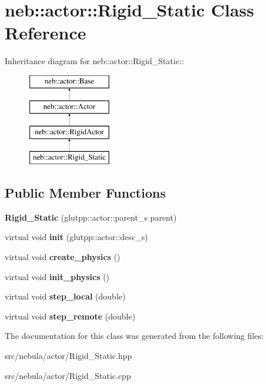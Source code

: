 \hypertarget{classneb_1_1actor_1_1Rigid__Static}{
\section{neb::actor::Rigid\_\-Static Class Reference}
\label{classneb_1_1actor_1_1Rigid__Static}
}
Inheritance diagram for neb::actor::Rigid\_\-Static::\begin{figure}[H]
\begin{center}
\leavevmode
\includegraphics[height=4cm]{classneb_1_1actor_1_1Rigid__Static}
\end{center}
\end{figure}
\subsection*{Public Member Functions}
\begin{DoxyCompactItemize}
\item 
\hypertarget{classneb_1_1actor_1_1Rigid__Static_a966402830e96d2a4982a845a6352b0ee}{
{\bfseries Rigid\_\-Static} (glutpp::actor::parent\_\-s parent)}
\label{classneb_1_1actor_1_1Rigid__Static_a966402830e96d2a4982a845a6352b0ee}

\item 
\hypertarget{classneb_1_1actor_1_1Rigid__Static_ab7d84259cceef7f16b9834de1ef1f2d9}{
virtual void {\bfseries init} (glutpp::actor::desc\_\-s)}
\label{classneb_1_1actor_1_1Rigid__Static_ab7d84259cceef7f16b9834de1ef1f2d9}

\item 
\hypertarget{classneb_1_1actor_1_1Rigid__Static_a9e8eec801df7d03445a9b4dd01fb8d67}{
virtual void {\bfseries create\_\-physics} ()}
\label{classneb_1_1actor_1_1Rigid__Static_a9e8eec801df7d03445a9b4dd01fb8d67}

\item 
\hypertarget{classneb_1_1actor_1_1Rigid__Static_a33c50f89376464b5f9ff2c0299fc211c}{
virtual void {\bfseries init\_\-physics} ()}
\label{classneb_1_1actor_1_1Rigid__Static_a33c50f89376464b5f9ff2c0299fc211c}

\item 
\hypertarget{classneb_1_1actor_1_1Rigid__Static_afca31b618b88aa4b20ca578a0a1e3a75}{
virtual void {\bfseries step\_\-local} (double)}
\label{classneb_1_1actor_1_1Rigid__Static_afca31b618b88aa4b20ca578a0a1e3a75}

\item 
\hypertarget{classneb_1_1actor_1_1Rigid__Static_a044fc1ffd31ca296271b00021a934ed6}{
virtual void {\bfseries step\_\-remote} (double)}
\label{classneb_1_1actor_1_1Rigid__Static_a044fc1ffd31ca296271b00021a934ed6}

\end{DoxyCompactItemize}


The documentation for this class was generated from the following files:\begin{DoxyCompactItemize}
\item 
src/nebula/actor/Rigid\_\-Static.hpp\item 
src/nebula/actor/Rigid\_\-Static.cpp\end{DoxyCompactItemize}
